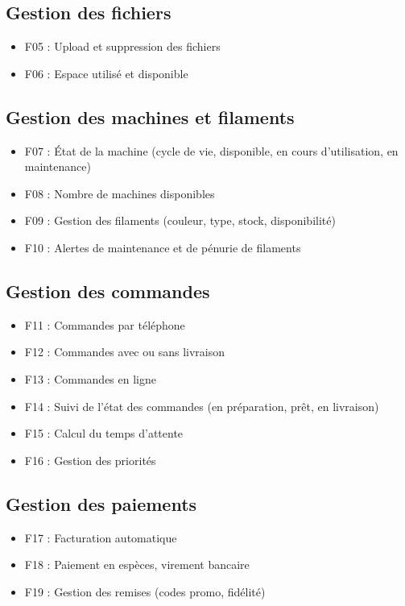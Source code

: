 \documentclass[12pt,a4paper]{article}
\begin{document}
\subsection{Gestion des fichiers}

\begin{itemize}
\item F05 : Upload et suppression des fichiers 
\item F06 : Espace utilisé et disponible
\end{itemize}

\subsection{Gestion des machines et filaments}

\begin{itemize}
\item F07 : État de la machine (cycle de vie, disponible, en cours d'utilisation, en maintenance) 
\item F08 : Nombre de machines disponibles
\item F09 : Gestion des filaments (couleur, type, stock, disponibilité)
\item F10 : Alertes de maintenance et de pénurie de filaments
\end{itemize}

\subsection{Gestion des commandes}

\begin{itemize}
\item F11 : Commandes par téléphone
\item F12 : Commandes avec ou sans livraison 
\item F13 : Commandes en ligne
\item F14 : Suivi de l'état des commandes (en préparation, prêt, en livraison)
\item F15 : Calcul du temps d'attente
\item F16 : Gestion des priorités
\end{itemize}

\subsection{Gestion des paiements}

\begin{itemize}
\item F17 : Facturation automatique
\item F18 : Paiement en espèces, virement bancaire
\item F19 : Gestion des remises (codes promo, fidélité)
\end{itemize}
\end{document}
